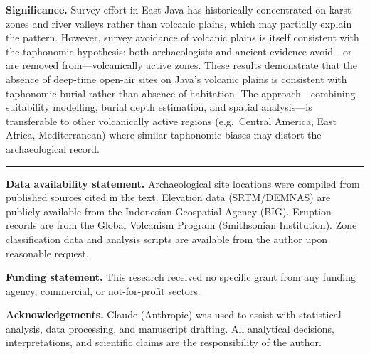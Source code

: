 \documentclass[12pt]{article}
\begin{document}
\textbf{Significance.}
Survey effort in East Java has historically concentrated on karst zones and river valleys rather than volcanic plains, which may partially explain the pattern.
However, survey avoidance of volcanic plains is itself consistent with the taphonomic hypothesis: both archaeologists and ancient evidence avoid---or are removed from---volcanically active zones.
These results demonstrate that the absence of deep-time open-air sites on Java's volcanic plains is consistent with taphonomic burial rather than absence of habitation.
The approach---combining suitability modelling, burial depth estimation, and spatial analysis---is transferable to other volcanically active regions (e.g.\ Central America, East Africa, Mediterranean) where similar taphonomic biases may distort the archaeological record.

\vspace{6pt}
\hrule
\vspace{6pt}

\textbf{Data availability statement.}
Archaeological site locations were compiled from published sources cited in the text. Elevation data (SRTM/DEMNAS) are publicly available from the Indonesian Geospatial Agency (BIG). Eruption records are from the Global Volcanism Program (Smithsonian Institution). Zone classification data and analysis scripts are available from the author upon reasonable request.

\vspace{6pt}

\textbf{Funding statement.}
This research received no specific grant from any funding agency, commercial, or not-for-profit sectors.

\vspace{6pt}

\textbf{Acknowledgements.}
Claude (Anthropic) was used to assist with statistical analysis, data processing, and manuscript drafting. All analytical decisions, interpretations, and scientific claims are the responsibility of the author.
\end{document}
